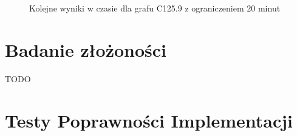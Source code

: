 \documentclass[12pt, a4paper]{article}
\begin{document}
\begin{figure}[H]
  \begin{center}
  \end{center}
  \caption{Kolejne wyniki w czasie dla grafu C125.9 z ograniczeniem 20 minut}
  \label{fig:ProgressC125.9-20min}
\end{figure}

\section{Badanie złożoności}

TODO

\section{Testy Poprawności Implementacji}
\end{document}
